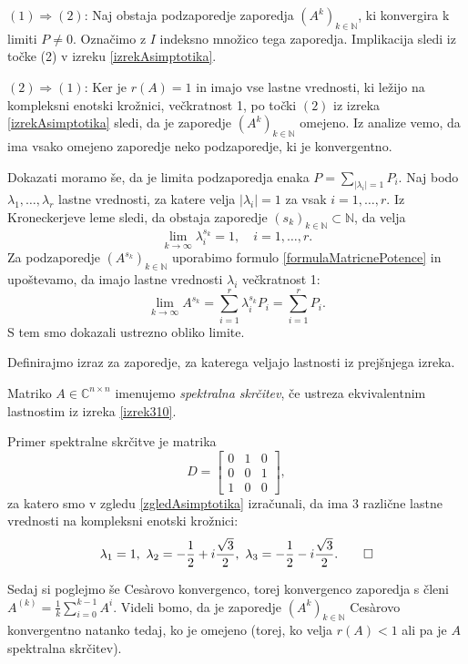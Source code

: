 \documentclass[mat1]{fmfdelo}
\newcommand{\N}{\mathbb N}
\newcommand{\C}{\mathbb C}
\begin{document}
\begin{dokaz}
    $(1) \Rightarrow (2)$: Naj obstaja podzaporedje zaporedja $(A^k)_{k\in\N}$, ki konvergira k limiti $P \neq 0$. Označimo z $I$ indeksno množico tega zaporedja. Implikacija sledi iz točke (2) v izreku \ref{izrekAsimptotika}.

    \noindent $(2) \Rightarrow (1)$: Ker je $r(A) = 1$ in imajo vse lastne vrednosti, ki ležijo na kompleksni enotski krožnici, večkratnost 1, po točki $(2)$ iz izreka \ref{izrekAsimptotika} sledi, da je zaporedje $(A^k)_{k\in\N}$ omejeno. Iz analize vemo, da ima vsako omejeno zaporedje neko podzaporedje, ki je konvergentno.

    Dokazati moramo še, da je limita podzaporedja enaka $P = \sum_{|\lambda_i| = 1} P_i$. Naj bodo $\lambda_1, \ldots, \lambda_r$ lastne vrednosti, za katere velja $|\lambda_i| = 1$ za vsak $i=1,\ldots,r$. Iz Kroneckerjeve leme sledi, da obstaja zaporedje $(s_k)_{k\in\N} \subset \N$, da velja
    \begin{equation*}
        \lim_{k \rightarrow \infty} \lambda_i^{s_k} = 1,\quad i=1,\ldots, r.
    \end{equation*}
    Za podzaporedje $(A^{s_k})_{k\in\N}$ uporabimo formulo \eqref{formulaMatricnePotence} in upoštevamo, da imajo lastne vrednosti $\lambda_i$ večkratnost 1:
    \begin{equation*}
        \lim_{k \rightarrow \infty} A^{s_k} = \sum_{i=1}^r \lambda_i^{s_k} P_i = \sum_{i=1}^r P_i.
    \end{equation*}
    S tem smo dokazali ustrezno obliko limite.
\end{dokaz}
Definirajmo izraz za zaporedje, za katerega veljajo lastnosti iz prejšnjega izreka.
\begin{definicija}
    Matriko $A \in \C^{n \times n}$ imenujemo \emph{spektralna skrčitev}, če ustreza ekvivalentnim lastnostim iz izreka \ref{izrek310}.
\end{definicija}
\begin{zgled}
    Primer spektralne skrčitve je matrika
    \begin{equation*}
        D =
        \begin{bmatrix}
            0 & 1 & 0 \\
            0 & 0 & 1 \\
            1 & 0 & 0
        \end{bmatrix},
    \end{equation*}
    za katero smo v zgledu \ref{zgledAsimptotika} izračunali, da ima $3$ različne lastne vrednosti na kompleksni enotski krožnici: \[\lambda_1=1,\ \lambda_2 = - \frac{1}{2} + i\frac{\sqrt{3}}{2},\ \lambda_3 = - \frac{1}{2} - i\frac{\sqrt{3}}{2}. \qedhere\]
\end{zgled}
Sedaj si poglejmo še Ces\`arovo konvergenco, torej konvergenco zaporedja s členi $A^{(k)} = \frac{1}{k} \sum_{i=0}^{k-1} A^i$. Videli bomo, da je zaporedje $(A^k)_{k\in\N}$ Ces\`arovo konvergentno natanko tedaj, ko je omejeno (torej, ko velja $r(A) < 1$ ali pa je $A$ spektralna skrčitev).
\end{document}
